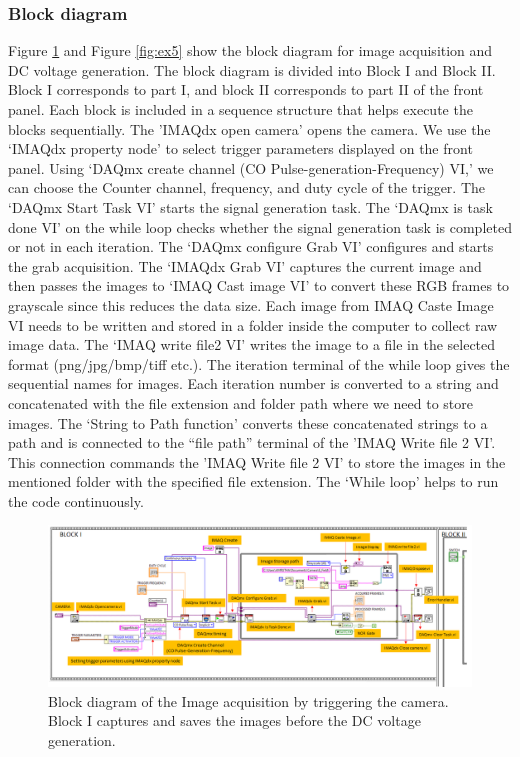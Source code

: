 \documentclass[journal=jacsat,manuscript=article]{achemso}
\begin{document}
\subsubsection{Block diagram}
Figure \ref{fig:ex4} and Figure \ref{fig:ex5} show the block diagram
for image acquisition and DC voltage generation. The block diagram is
divided into Block I and Block II. Block I corresponds to part I, and
block II corresponds to part II of the front panel. Each block is
included in a sequence structure that helps execute the blocks
sequentially. The 'IMAQdx open camera' opens the camera. We use the
‘IMAQdx property node’ to select trigger parameters displayed on the
front panel. Using ‘DAQmx create channel (CO
Pulse-generation-Frequency) VI,’ we can choose the Counter channel,
frequency, and duty cycle of the trigger. The ‘DAQmx Start Task VI’
starts the signal generation task.  The ‘DAQmx is task done VI’ on the
while loop checks whether the signal generation task is completed or
not in each iteration. The ‘DAQmx configure Grab VI’ configures and
starts the grab acquisition. The ‘IMAQdx Grab VI’ captures the current
image and then passes the images to ‘IMAQ Cast image VI’ to convert
these RGB frames to grayscale since this reduces the data size. Each
image from IMAQ Caste Image VI needs to be written and stored in a
folder inside the computer to collect raw image data. The ‘IMAQ write
file2 VI’ writes the image to a file in the selected format
(png/jpg/bmp/tiff etc.). The iteration terminal of the while loop
gives the sequential names for images. Each iteration number is
converted to a string and concatenated with the file extension and
folder path where we need to store images. The ‘String to Path
function’ converts these concatenated strings to a path and is
connected to the “file path” terminal of the 'IMAQ Write file 2
VI'. This connection commands the 'IMAQ Write file 2 VI' to store the
images in the mentioned folder with the specified file extension. The
‘While loop’ helps to run the code continuously.
\begin{figure}[H]
    \centering
    \includegraphics[width=1.3\linewidth,angle=90 ]{BLOCK1.png}
    \caption{Block diagram of the Image acquisition by triggering the
      camera. Block I captures and saves the images before the DC
      voltage generation.}
    \label{fig:ex4}
\end{figure}
\end{document}
